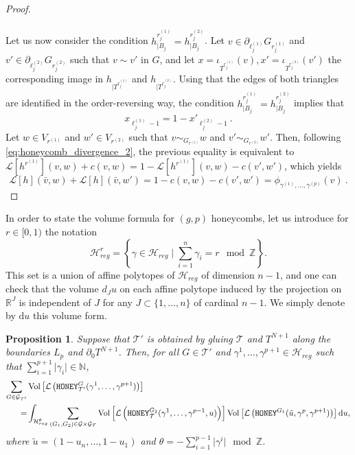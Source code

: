 \documentclass[11pt,a4paper]{amsart}
\providecommand{\diff}{\mathrm d}
\providecommand{\Vol}{\operatorname{Vol}}
\providecommand{\honey}{\texttt{\textsc{HONEY}}}
\numberwithin{equation}{section}
\newtheorem{proposition}[theorem]{Proposition}
\theoremstyle{definition}
\begin{document}
\begin{proof}
    \\
    \\
    Let us now consider the condition $h^{r_j^{(1)}}_{\vert B_j } = 
    h^{r_j^{(2)}}_{\vert B_j}$. 
    Let $v\in \partial_{\ell^{(1)}_j}G_{r^{(1)}_j}$ 
    and $v'\in \partial_{\ell^{(2)}_j}G_{r^{(2)}_j}$ 
    such that $v\sim v'$ in $G$, and let 
    $x=\iota_{T^{r^{(1)}_j}}(v), x'=\iota_{T^{r^{(2)}_j}}(v')$ 
    the corresponding image in $h_{\vert T^{r^{(1)}_j}}$ 
    and $h_{\vert T^{r^{(2)}_j}}$. 
    Using that the edges of both triangles are identified in 
    the order-reversing way, the condition 
    $h^{r_j^{(1)}}_{\vert B_j } = 
    h^{r_j^{(2)}}_{\vert B_j}$ implies that 
    $$x_{\ell^{(1)}_j-1}=1-x'_{\ell^{(2)}_j-1} \ .$$
    Let $w\in V_{r^{(1)}}$ and $w'\in V_{r^{(2)}}$ 
    such that $v\sim_{G_{r^{(1)}}}w$ and $v'\sim_{G_{r^{(2)}}}w'$. 
    Then, following \eqref{eq:honeycomb_divergence_2}, 
    the previous equality is equivalent to 
    $\mathcal{L}[h^{r^{(1)}}](v,w)+c(v,w) = 
    1-\mathcal{L}[h^{r^{(1)}}](v,w)-c(v',w')$, 
    which yields
    $$\mathcal{L}[h](\bar{v},w)+\mathcal{L}[h](\bar{v},w') = 
    1-c(v,w)-c(v',w')= \phi_{\gamma^{(1)},\ldots,\gamma^{(p)}}(v) \ .$$
\end{proof}

\noindent
In order to state the volume formula for $(g,p)$ honeycombs, 
let us introduce for $r\in[0,1)$ the notation 
$$\mathcal{H}_{reg}^{r} = \left\{\gamma\in\mathcal{H}_{reg} \mid 
\sum_{i=1}^n\gamma_i=r\mod \mathbb{Z}\right\}.$$
This set is a union of affine polytopes of $\mathcal{H}_{reg}$ 
of dimension $n-1$, and one can check that the volume $d_Ju$ 
on each affine polytope induced by the projection on $\mathbb{R}^J$ 
is independent of $J$ for any $J\subset\{1,\ldots,n\}$ of 
cardinal $n-1$. We simply denote by $\diff u$ this volume form.


\begin{proposition}
    \label{prop:formula_gluing_honey}
    Suppose that $\mathcal{T}'$ is obtained by 
    gluing $\mathcal{T}$ and $T^{N+1}$ along the boundaries 
    $L_p$ and $\partial_0 T^{N+1}$. 
    Then, for all $G\in \mathcal{T}'$ and 
    $\gamma^1,\ldots,\gamma^{p+1}\in \mathcal{H}_{reg}$ such that 
    $\sum_{i=1}^{p+1}\vert \gamma_i\vert\in \mathbb{N}$,
    \begin{align*}
    \sum_{G\in\mathcal{G}_{\mathcal{T}'}} & 
    \Vol \left[ \mathcal{L}\left(\honey_{\mathcal{T}'}^{G}(\gamma^1,\ldots,\gamma^{p+1})\right) \right]\\
    =& \int_{\mathcal{H}_{reg}^{\theta} } 
    \sum_{(G_1,G_2)\in\mathcal{G}\times\mathcal{G}_{\mathcal{T}}} 
    \Vol \left[ \mathcal{L}\left(\honey_{\mathcal{T}}^{G_2}(\gamma^1,\ldots,\gamma^{p-1},u)\right) \right] 
    \Vol \left[ \mathcal{L}\left(\honey^{G_1}(\tilde{u},\gamma^p,\gamma^{p+1})\right) \right] \diff u,
    \end{align*}
    where $\tilde{u}=(1-u_n,\ldots,1-u_1)$ and $\theta=-\sum_{i=1}^{p-1}\vert \gamma^i\vert\mod \mathbb{Z}$.
\end{proposition}
\end{document}
